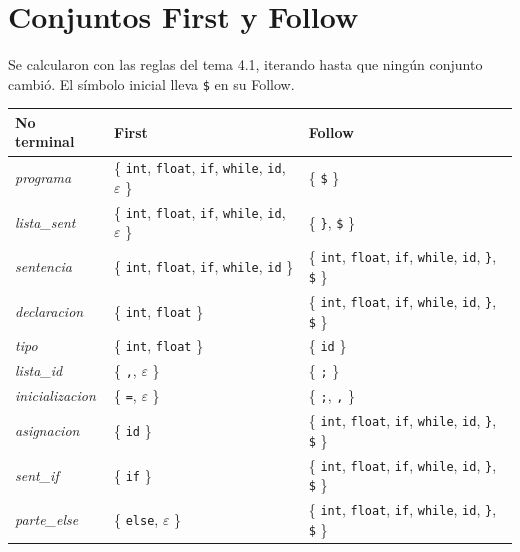 \documentclass[12pt]{article}
\newcommand{\cmd}[1]{\texttt{\small #1}}
\newcommand{\nt}[1]{\textit{#1}}
\begin{document}
\section{Conjuntos First y Follow}
\label{sec:firstfollow}

Se calcularon con las reglas del tema 4.1, iterando hasta que ningún conjunto cambió. El símbolo
inicial lleva \cmd{\$} en su Follow.

\begin{table}[!htbp]
\centering\footnotesize
\renewcommand{\arraystretch}{1.25}
\begin{tabular}{@{}l >{\raggedright\arraybackslash}p{5.5cm} >{\raggedright\arraybackslash}p{6.3cm}@{}}
\toprule
\textbf{No terminal} & \textbf{First} & \textbf{Follow} \\
\midrule
\nt{programa} & \{ \texttt{int}, \texttt{float}, \texttt{if}, \texttt{while}, \texttt{id}, $\varepsilon$ \} & \{ \texttt{\$} \} \\
\nt{lista\_sent} & \{ \texttt{int}, \texttt{float}, \texttt{if}, \texttt{while}, \texttt{id}, $\varepsilon$ \} & \{ \texttt{\}}, \texttt{\$} \} \\
\nt{sentencia} & \{ \texttt{int}, \texttt{float}, \texttt{if}, \texttt{while}, \texttt{id} \} & \{ \texttt{int}, \texttt{float}, \texttt{if}, \texttt{while}, \texttt{id}, \texttt{\}}, \texttt{\$} \} \\
\nt{declaracion} & \{ \texttt{int}, \texttt{float} \} & \{ \texttt{int}, \texttt{float}, \texttt{if}, \texttt{while}, \texttt{id}, \texttt{\}}, \texttt{\$} \} \\
\nt{tipo} & \{ \texttt{int}, \texttt{float} \} & \{ \texttt{id} \} \\
\nt{lista\_id} & \{ \texttt{,}, $\varepsilon$ \} & \{ \texttt{;} \} \\
\nt{inicializacion} & \{ \texttt{=}, $\varepsilon$ \} & \{ \texttt{;}, \texttt{,} \} \\
\nt{asignacion} & \{ \texttt{id} \} & \{ \texttt{int}, \texttt{float}, \texttt{if}, \texttt{while}, \texttt{id}, \texttt{\}}, \texttt{\$} \} \\
\nt{sent\_if} & \{ \texttt{if} \} & \{ \texttt{int}, \texttt{float}, \texttt{if}, \texttt{while}, \texttt{id}, \texttt{\}}, \texttt{\$} \} \\
\nt{parte\_else} & \{ \texttt{else}, $\varepsilon$ \} & \{ \texttt{int}, \texttt{float}, \texttt{if}, \texttt{while}, \texttt{id}, \texttt{\}}, \texttt{\$} \} \\

\end{tabular}
\end{table}
\end{document}
